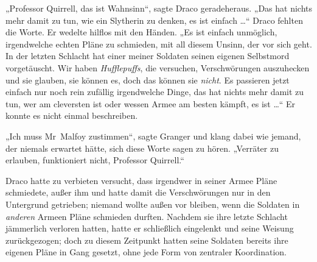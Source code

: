 „Professor Quirrell, das ist Wahnsinn“, sagte Draco geradeheraus.
„Das hat nichts mehr damit zu tun, wie ein Slytherin zu denken, es ist einfach …“ Draco fehlten die Worte. Er wedelte hilflos mit den Händen.
„Es ist einfach unmöglich, irgendwelche echten Pläne zu schmieden, mit all diesem Unsinn, der vor sich geht. In der letzten Schlacht hat einer meiner Soldaten seinen eigenen Selbstmord vorgetäuscht. Wir haben \emph{Hufflepuffs}, die versuchen, Verschwörungen auszuhecken und sie glauben, sie können es, doch das können sie \emph{nicht}. Es passieren jetzt einfach nur noch rein zufällig irgendwelche Dinge, das hat nichts mehr damit zu tun, wer am cleversten ist oder wessen Armee am besten kämpft, es ist …“ Er konnte es nicht einmal beschreiben.

„Ich muss Mr~Malfoy zustimmen“, sagte Granger und klang dabei wie jemand, der niemals erwartet hätte, sich diese Worte sagen zu hören.
„Verräter zu erlauben, funktioniert nicht, Professor Quirrell.“

Draco hatte zu verbieten versucht, dass irgendwer in seiner Armee Pläne schmiedete, außer ihm und hatte damit die Verschwörungen nur in den Untergrund getrieben; niemand wollte außen vor bleiben, wenn die Soldaten in \emph{anderen} Armeen Pläne schmieden durften. Nachdem sie ihre letzte Schlacht jämmerlich verloren hatten, hatte er schließlich eingelenkt und seine Weisung zurückgezogen; doch zu diesem Zeitpunkt hatten seine Soldaten bereits ihre eigenen Pläne in Gang gesetzt, ohne jede Form von zentraler Koordination.


